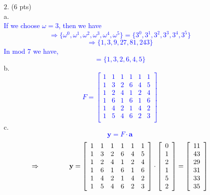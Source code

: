 \documentclass[11pt]{article}
\begin{document}
\begin{itemize}
\item[$2.$] (6 pts)\\
a.\\
\textcolor{blue}{ 
If we choose $\omega = 3$, then we have $$\Rightarrow \big\{ \omega^0, \omega^1, \omega^2, \omega^3, \omega^4, \omega^5  \big\} = \big\{ 3^0,  3^1, 3^2, 3^3, 3^4, 3^5  \big\}$$ $$\Rightarrow \big\{ 1, 3, 9, 27, 81, 243  \big\}$$ In mod 7 we have, $$= \big\{ 1, 3, 2, 6, 4, 5  \big\}$$
}
b.\\
\textcolor{blue}{ 
 \[
   F=
  \left[ {\begin{array}{cccccc}
   1 & 1 & 1 & 1 & 1 & 1\\
   1 & 3 & 2 & 6 & 4 & 5\\
   1 & 2 & 4 & 1 & 2 & 4\\
   1 & 6 & 1 & 6 & 1 & 6\\
   1 & 4 & 2 & 1 & 4 & 2\\
   1 & 5 & 4 & 6 & 2 & 3\\
  \end{array} } \right]
\]
}
c.\\
\textcolor{blue}{ 
$$\textbf{y} = F \cdot \textbf{a}$$
 \[
   \Rightarrow \hspace{1.5cm} \textbf{y} =
  \left[ {\begin{array}{cccccc}
   1 & 1 & 1 & 1 & 1 & 1\\
   1 & 3 & 2 & 6 & 4 & 5\\
   1 & 2 & 4 & 1 & 2 & 4\\
   1 & 6 & 1 & 6 & 1 & 6\\
   1 & 4 & 2 & 1 & 4 & 2\\
   1 & 5 & 4 & 6 & 2 & 3\\
  \end{array} } \right]
  \cdot 
    \left[ {\begin{array}{c}
   0\\
   1\\
   2\\
   1\\
   5\\
   2\\
  \end{array} } \right]
   	= 
	\left[ {\begin{array}{c}
  	 11\\
 	  43\\
  	 29\\
  	 31\\
  	 33\\
  	 35\\
  \end{array} } \right]
\]}
\end{itemize}
\end{document}
